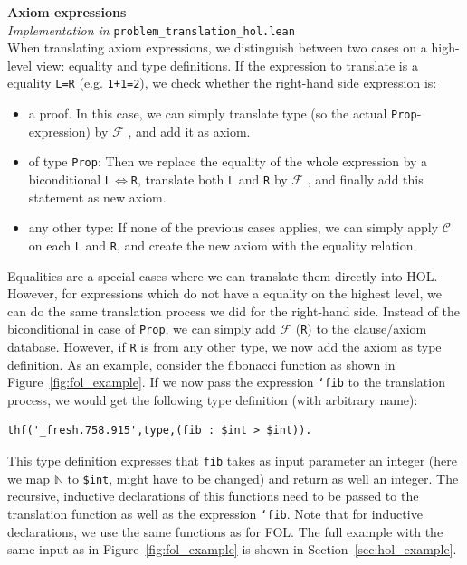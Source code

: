 \documentclass[a4paper]{article}
\newcommand{\F}[0]{$\mathcal{F}$ }
\newcommand{\C}[0]{$\mathcal{C}$ }
\begin{document}
\textbf{Axiom expressions}\\
\textit{Implementation in }\texttt{problem\_translation\_hol.lean}\\
When translating axiom expressions, we distinguish between two cases on a high-level view: equality and type definitions. If the expression to translate is a equality \texttt{L=R} (e.g. \texttt{1+1=2}), we check whether the right-hand side expression is:
\begin{itemize}
	\item a proof. In this case, we can simply translate type (so the actual \texttt{Prop}-expression) by \F, and add it as axiom.
	\item of type \texttt{Prop}: Then we replace the equality of the whole expression by a biconditional \texttt{L}$\Leftrightarrow$\texttt{R}, translate both \texttt{L} and \texttt{R} by \F, and finally add this statement as new axiom.
	\item any other type: If none of the previous cases applies, we can simply apply \C on each \texttt{L} and \texttt{R}, and create the new axiom with the equality relation.
\end{itemize}

Equalities are a special cases where we can translate them directly into HOL. However, for expressions which do not have a equality on the highest level, we can do the same translation process we did for the right-hand side. Instead of the biconditional in case of \texttt{Prop}, we can simply add \F(\texttt{R}) to the clause/axiom database. However, if \texttt{R} is from any other type, we now add the axiom as type definition. As an example, consider the fibonacci function as shown in Figure~\ref{fig:fol_example}. If we now pass the expression \texttt{`fib} to the translation process, we would get the following type definition (with arbitrary name):
\begin{verbatim}
thf('_fresh.758.915',type,(fib : $int > $int)).
\end{verbatim}
This type definition expresses that \texttt{fib} takes as input parameter an integer (here we map $\mathbb{N}$ to \texttt{\$int}, might have to be changed) and return as well an integer. The recursive, inductive declarations of this functions need to be passed to the translation function as well as the expression \texttt{`fib}. Note that for inductive declarations, we use the same functions as for FOL. The full example with the same input as in Figure~\ref{fig:fol_example} is shown in Section~\ref{sec:hol_example}.
\end{document}
